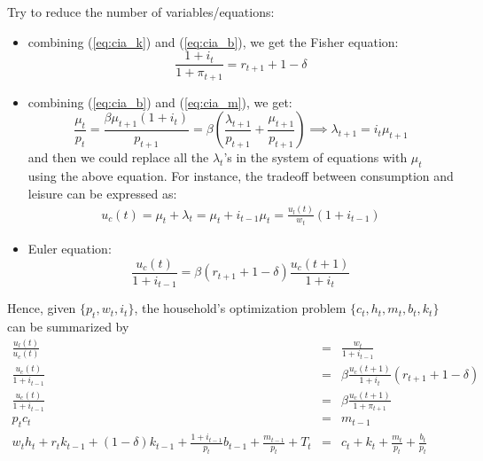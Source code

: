 \documentclass[12pt]{article}
\begin{document}
Try to reduce the number of variables/equations:
\begin{itemize}
	\item combining (\ref{eq:cia_k}) and (\ref{eq:cia_b}), we get the Fisher equation:
	\begin{equation}
		\frac{1 + i_t}{1 + \pi_{t+1}} = r_{t+1} + 1 - \delta
	\end{equation}
	\item combining (\ref{eq:cia_b}) and (\ref{eq:cia_m}), we get:
	\begin{equation}
		\frac{\mu_t}{p_t} = \frac{\beta \mu_{t+1}(1 + i_t)}{p_{t+1}} = \beta(\frac{\lambda_{t+1}}{p_{t+1}} + \frac{\mu_{t+1}}{p_{t+1}}) \implies \lambda_{t+1} = i_t \mu_{t+1}
	\end{equation}
and then we could replace all the $\lambda_t$'s in the system of equations with $\mu_t$ using the above equation. For instance, the tradeoff between consumption and leisure can be expressed as:
	\begin{align}
		u_c(t) = \mu_t + \lambda_t = \mu_t + i_{t-1} \mu_t = \frac{u_l(t)}{w_t}(1+i_{t-1}) 
	\end{align}
	\item Euler equation:
	\begin{equation}
		\frac{u_c(t)}{1+i_{t-1}} = \beta(r_{t+1} + 1-\delta)\frac{u_c(t+1)}{1+i_t}
	\end{equation}
\end{itemize}
Hence, given $\{p_t, w_t, i_t\}$, the household's optimization problem $\{c_t, h_t, m_t, b_t, k_t\}$ can be summarized by 
\begin{eqnarray}
	\frac{u_l(t)}{u_c(t)} &=& \frac{w_t}{1+i_{t-1}} \\
	\frac{u_c(t)}{1+i_{t-1}} &=& \beta \frac{u_c(t+1)}{1+i_t} (r_{t+1} + 1 - \delta) \\
	\frac{u_c(t)}{1+i_{t-1}} &=& \beta \frac{u_c(t+1)}{1+\pi_{t+1}} \\
	p_t c_t &=& m_{t-1} \\
	w_th_t + r_t k_{t-1} + (1-\delta)k_{t-1} + \frac{1+i_{t-1}}{p_t}b_{t-1} + \frac{m_{t-1}}{p_t} + T_t &=&  c_t + k_t + \frac{m_t}{p_t} + \frac{b_t}{p_t}
\end{eqnarray}
\end{document}
